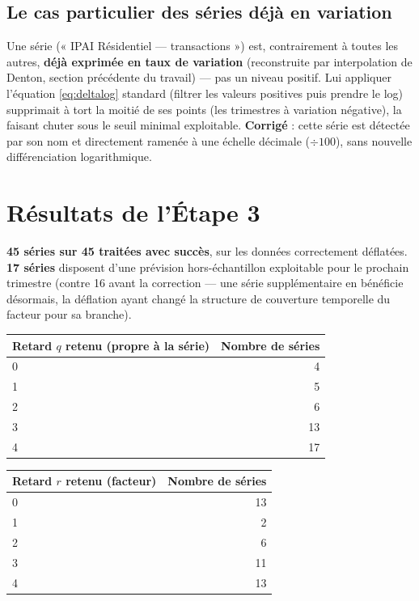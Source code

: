 \documentclass[11pt,a4paper]{article}
\begin{document}
\subsection{Le cas particulier des séries déjà en variation}
\label{sec:cas_ipai}

\begin{alertebox}
Une série (« IPAI Résidentiel --- transactions ») est, contrairement à toutes les autres, \textbf{déjà exprimée en taux de variation} (reconstruite par interpolation de Denton, section précédente du travail) --- pas un niveau positif. Lui appliquer l'équation \ref{eq:deltalog} standard (filtrer les valeurs positives puis prendre le log) supprimait à tort la moitié de ses points (les trimestres à variation négative), la faisant chuter sous le seuil minimal exploitable. \textbf{Corrigé} : cette série est détectée par son nom et directement ramenée à une échelle décimale ($\div 100$), sans nouvelle différenciation logarithmique.
\end{alertebox}

\section{Résultats de l'Étape 3}

\begin{resultatbox}
\textbf{45 séries sur 45 traitées avec succès}, sur les données correctement déflatées. \textbf{17 séries} disposent d'une prévision hors-échantillon exploitable pour le prochain trimestre (contre 16 avant la correction --- une série supplémentaire en bénéficie désormais, la déflation ayant changé la structure de couverture temporelle du facteur pour sa branche).
\end{resultatbox}

\begin{center}
\small
\begin{tabular}{lr}
\toprule
\textbf{Retard $q$ retenu (propre à la série)} & \textbf{Nombre de séries} \\
\midrule
0 & 4 \\ 1 & 5 \\ 2 & 6 \\ 3 & 13 \\ 4 & 17 \\
\bottomrule
\end{tabular}
\hspace{1cm}
\begin{tabular}{lr}
\toprule
\textbf{Retard $r$ retenu (facteur)} & \textbf{Nombre de séries} \\
\midrule
0 & 13 \\ 1 & 2 \\ 2 & 6 \\ 3 & 11 \\ 4 & 13 \\
\bottomrule
\end{tabular}
\end{center}
\end{document}
